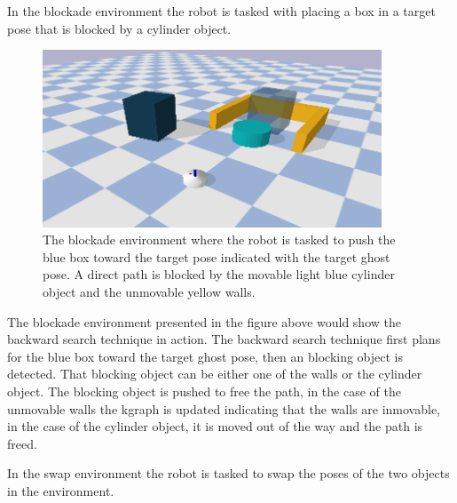 In the blockade environment the robot is tasked with placing a box in a target pose that is blocked by a cylinder object.\bs
\begin{figure}[H]
  \centering
  \includegraphics[width=0.9\textwidth]{figures/results/blockade}
  \caption{The blockade environment where the robot is tasked to push the blue box toward the target pose indicated with the target ghost pose. A direct path is blocked by the movable light blue cylinder object and the unmovable yellow walls.}%
  \label{fig:benchmark_blockade}
\end{figure}

The blockade environment presented in the figure above would show the backward search technique in action. The backward search technique first plans for the blue box toward the target ghost pose, then an blocking object is detected. That blocking object can be either one of the walls or the cylinder object. The blocking object is pushed to free the path, in the case of the unmovable walls the \ac{kgraph} is updated indicating that the walls are inmovable, in the case of the cylinder object, it is moved out of the way and the path is freed.\bs

In the swap environment the robot is tasked to swap the poses of the two objects in the environment.\bs

